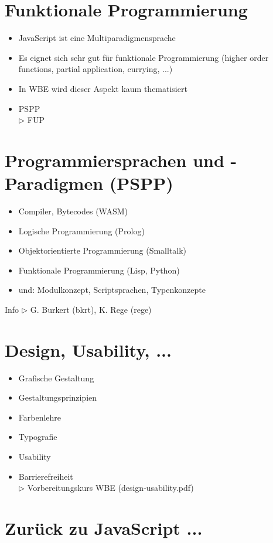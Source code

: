 \section*{Funktionale Programmierung}
\begin{itemize}
  \item JavaScript ist eine Multiparadigmensprache
  \item Es eignet sich sehr gut für funktionale Programmierung (higher order functions, partial application, currying, ...)
  \item In WBE wird dieser Aspekt kaum thematisiert
  \item PSPP\\
$\triangleright$ FUP
\end{itemize}

\section*{Programmiersprachen und -Paradigmen (PSPP)}
\begin{itemize}
  \item Compiler, Bytecodes (WASM)
  \item Logische Programmierung (Prolog)
  \item Objektorientierte Programmierung (Smalltalk)
  \item Funktionale Programmierung (Lisp, Python)
  \item und: Modulkonzept, Scriptsprachen, Typenkonzepte
\end{itemize}

Info $\triangleright$ G. Burkert (bkrt), K. Rege (rege)



\section*{Design, Usability, ...}
\begin{itemize}
  \item Grafische Gestaltung
  \item Gestaltungsprinzipien
  \item Farbenlehre
  \item Typografie
  \item Usability
  \item Barrierefreiheit\\
$\triangleright$ Vorbereitungskurs WBE (design-usability.pdf)
\end{itemize}

\section*{Zurück zu JavaScript ...}
